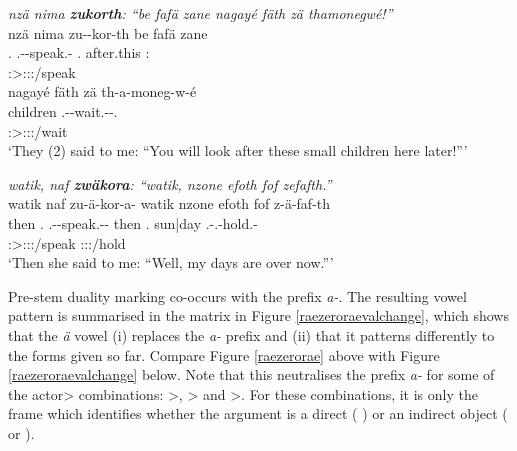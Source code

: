 \begin{exe}
	\ex \emph{nzä nima \textbf{zukorth}: ``be fafä zane nagayé fäth zä thamonegwé!''}\\
	\glll nzä nima zu-\Zero-kor-th be fafä zane\\
	\Fsg.\Abs{} \Quot{} \Fsg.\Gam-\Du-speak.\Rs-\Stnsg{} \Ssg.\Erg{} after.this \Dem:\Prox{}\\
	{} {} \footnotesize{\Stdu:\Sbj>\Fsg:\Obj:\Rpst:\Pfv/speak} {} {} {}\\
	\sn
	\glll nagayé fäth zä th-a-moneg-w-é\\
	children \Dim{} \Prox{} \Stnsg.\Bet-\Vc-wait.\Ext-\Ndu-\Ssg.\Imp{}\\
	{} {} {} \footnotesize{\Ssg:\Sbj>\Stpl:\Io:\Imp:\Ipfv/wait}\\
	\trans `They (2) said to me: ``You will look after these small children here later!'''\\
	\label{ex258}
\end{exe}
\begin{exe}
	\ex \emph{watik, naf \textbf{zwäkora}: ``watik, nzone efoth fof zefafth.''}\\
	\glll watik naf zu-ä-kor-a-\Zero{} watik nzone efoth fof z-ä-faf-th\\
	then \Tsg.\Erg{} \Fsg.\Gam-\Ndu-speak.\Rs-\Pst-\Stsg{} then \Fsg.\Poss{} sun|day \Emph{} \M.\Gam-\Ndu.\Vc-hold.\Rs-\Stnsg{}\\
	{} {} \footnotesize{\Stsg:\Sbj>\Fsg:\Obj:\Pst:\Pfv/speak} {} {} {} {} \footnotesize{\Stnsg:\Sbj:\Pst:\Pfv/hold}\\
	\trans `Then she said to me: ``Well, my days are over now.'''
	\label{ex257}
\end{exe}

Pre-stem duality marking co-occurs with the  prefix \emph{a-}. The resulting vowel pattern is summarised in the matrix in Figure \ref{raezeroraevalchange}, which shows that the  \emph{ä} vowel (i) replaces the \emph{a-} prefix and (ii) that it patterns differently to the forms given so far. Compare Figure \ref{raezerorae} above with Figure \ref{raezeroraevalchange} below. Note that this neutralises the  prefix \emph{a-} for some of the actor> combinations: \Pl>\Sg{}, \Sg>\Pl{} and \Pl>\Pl{}. For these combinations, it is only the  frame which identifies whether the  argument is a direct  (\Abs{} ) or an indirect object (\Dat{} or \Poss{} ).

